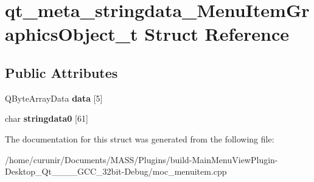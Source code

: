 \hypertarget{structqt__meta__stringdata___menu_item_graphics_object__t}{}\section{qt\+\_\+meta\+\_\+stringdata\+\_\+\+Menu\+Item\+Graphics\+Object\+\_\+t Struct Reference}
\label{structqt__meta__stringdata___menu_item_graphics_object__t}
\subsection*{Public Attributes}
\begin{DoxyCompactItemize}
\item 
Q\+Byte\+Array\+Data {\bfseries data} \mbox{[}5\mbox{]}\hypertarget{structqt__meta__stringdata___menu_item_graphics_object__t_af9745a02d5975d686fd2629c225f37fc}{}\label{structqt__meta__stringdata___menu_item_graphics_object__t_af9745a02d5975d686fd2629c225f37fc}

\item 
char {\bfseries stringdata0} \mbox{[}61\mbox{]}\hypertarget{structqt__meta__stringdata___menu_item_graphics_object__t_a56e432638c023dce510aebff66c320c7}{}\label{structqt__meta__stringdata___menu_item_graphics_object__t_a56e432638c023dce510aebff66c320c7}

\end{DoxyCompactItemize}


The documentation for this struct was generated from the following file\+:\begin{DoxyCompactItemize}
\item 
/home/curunir/\+Documents/\+M\+A\+S\+S/\+Plugins/build-\/\+Main\+Menu\+View\+Plugin-\/\+Desktop\+\_\+\+Qt\+\_\+\_\+\_\+\_\+\+G\+C\+C\+\_\+32bit-\/\+Debug/moc\+\_\+menuitem.\+cpp\end{DoxyCompactItemize}
